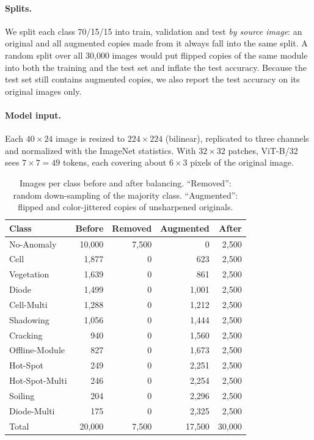 \paragraph{Splits.}
We split each class 70/15/15 into train, validation and test \emph{by source image}: an original and all augmented copies made from it always fall into the same split.
A random split over all 30{,}000 images would put flipped copies of the same module into both the training and the test set and inflate the test accuracy.
Because the test set still contains augmented copies, we also report the test accuracy on its original images only.

\paragraph{Model input.}
Each $40\times24$ image is resized to $224\times224$ (bilinear), replicated to three channels and normalized with the ImageNet statistics.
With $32\times32$ patches, ViT-B/32 sees $7\times7=49$ tokens, each covering about $6\times3$ pixels of the original image.

\begin{table}[t]
  \centering
  \small
  \setlength{\tabcolsep}{4pt}
  \begin{tabular}{@{}lrrrr@{}}
    \toprule
    Class & Before & Removed & Augmented & After \\
    \midrule
    No-Anomaly     & 10{,}000 & 7{,}500 & 0       & 2{,}500 \\
    Cell           & 1{,}877  & 0       & 623     & 2{,}500 \\
    Vegetation     & 1{,}639  & 0       & 861     & 2{,}500 \\
    Diode          & 1{,}499  & 0       & 1{,}001 & 2{,}500 \\
    Cell-Multi     & 1{,}288  & 0       & 1{,}212 & 2{,}500 \\
    Shadowing      & 1{,}056  & 0       & 1{,}444 & 2{,}500 \\
    Cracking       & 940      & 0       & 1{,}560 & 2{,}500 \\
    Offline-Module & 827      & 0       & 1{,}673 & 2{,}500 \\
    Hot-Spot       & 249      & 0       & 2{,}251 & 2{,}500 \\
    Hot-Spot-Multi & 246      & 0       & 2{,}254 & 2{,}500 \\
    Soiling        & 204      & 0       & 2{,}296 & 2{,}500 \\
    Diode-Multi    & 175      & 0       & 2{,}325 & 2{,}500 \\
    \midrule
    Total          & 20{,}000 & 7{,}500 & 17{,}500 & 30{,}000 \\
    \bottomrule
  \end{tabular}
  \caption{Images per class before and after balancing. ``Removed'': random down-sampling of the majority class. ``Augmented'': flipped and color-jittered copies of unsharpened originals.}
  \label{tab:p2-balance}
\end{table}

